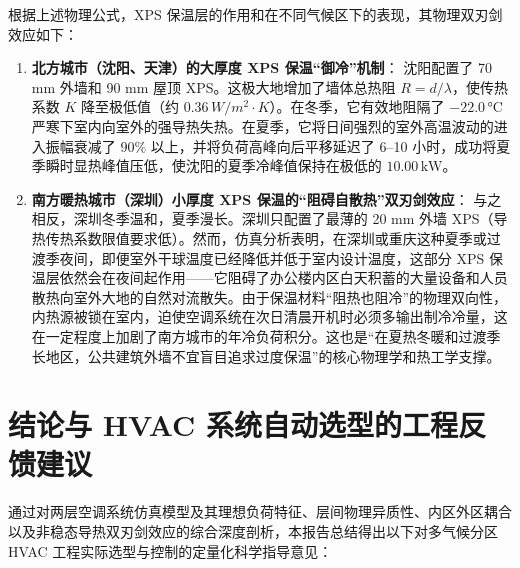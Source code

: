 \documentclass[11pt,a4paper]{article}
\begin{document}
根据上述物理公式，XPS 保温层的作用和在不同气候区下的表现，其物理双刃剑效应如下：

\begin{enumerate}
    \item \textbf{北方城市（沈阳、天津）的大厚度 XPS 保温“御冷”机制}：
    沈阳配置了 70 mm 外墙和 90 mm 屋顶 XPS。这极大地增加了墙体总热阻 $R = d/\lambda$，使传热系数 $K$ 降至极低值（约 $0.36\,\si{W/m^2\cdot K}$）。在冬季，它有效地阻隔了 $-22.0\,\si{\degreeCelsius}$ 严寒下室内向室外的强导热失热。在夏季，它将日间强烈的室外高温波动的进入振幅衰减了 $90\%$ 以上，并将负荷高峰向后平移延迟了 6--10 小时，成功将夏季瞬时显热峰值压低，使沈阳的夏季冷峰值保持在极低的 $10.00\,\mathrm{kW}$。
    
    \item \textbf{南方暖热城市（深圳）小厚度 XPS 保温的“阻碍自散热”双刃剑效应}：
    与之相反，深圳冬季温和，夏季漫长。深圳只配置了最薄的 20 mm 外墙 XPS（导热传热系数限值要求低）。然而，仿真分析表明，在深圳或重庆这种夏季或过渡季夜间，即便室外干球温度已经降低并低于室内设计温度，这部分 XPS 保温层依然会在夜间起作用——它阻碍了办公楼内区白天积蓄的大量设备和人员散热向室外大地的自然对流散失。由于保温材料“阻热也阻冷”的物理双向性，内热源被锁在室内，迫使空调系统在次日清晨开机时必须多输出制冷冷量，这在一定程度上加剧了南方城市的年冷负荷积分。这也是“在夏热冬暖和过渡季长地区，公共建筑外墙不宜盲目追求过度保温”的核心物理学和热工学支撑。
\end{enumerate}

\section{结论与 HVAC 系统自动选型的工程反馈建议}

通过对两层空调系统仿真模型及其理想负荷特征、层间物理异质性、内区外区耦合以及非稳态导热双刃剑效应的综合深度剖析，本报告总结得出以下对多气候分区 HVAC 工程实际选型与控制的定量化科学指导意见：
\end{document}
